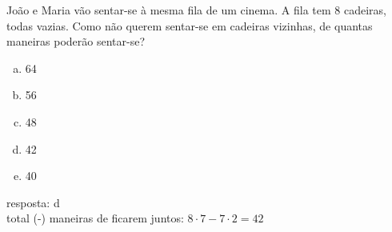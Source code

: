 \begin{ex}
 João e Maria vão sentar-se à mesma fila de um cinema. A fila tem 8 cadeiras, todas vazias. Como não querem sentar-se em cadeiras vizinhas, de quantas maneiras poderão sentar-se?
    \begin{enumerate}[(a)]
    \item 64
    \item 56
    \item 48
    \item 42
    \item 40
    \end{enumerate}
      \begin{sol}
        resposta: d \\
        total (-) maneiras de ficarem juntos: $8\cdot7 - 7\cdot 2=42$
      \end{sol}
\end{ex}